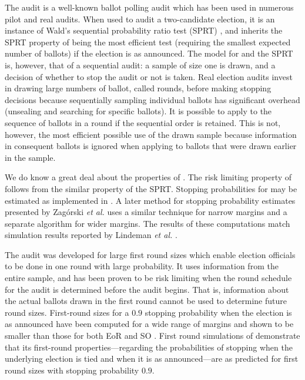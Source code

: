 The \BRAVO audit \cite{bravo} is a well-known ballot polling audit which has been used in numerous pilot and real audits. When used to audit a two-candidate election, it is an instance of Wald's sequential probability ratio test (SPRT) \cite{wald}, and inherits the SPRT property of being the most efficient test (requiring the smallest expected number of ballots) if the election is as announced. The model for \BRAVO and the SPRT is, however, that of a sequential audit: a sample of size one is drawn, and a decision of whether to stop the audit or not is taken. Real election audits invest in drawing large numbers of ballot, called rounds, before making stopping decisions because sequentially sampling individual ballots has significant overhead (unsealing and searching for specific ballots). It is possible to apply \BRAVO to the sequence of ballots in a round if the sequential order is retained. This is not, however, the most efficient possible use of the drawn sample because information in consequent ballots is ignored when applying \BRAVO to ballots that were drawn earlier in the sample. 

We do know a great deal about the properties of \BRAVO. The risk limiting property of \BRAVO follows from the similar property of the SPRT. Stopping probabilities for \BRAVO may be estimated as implemented in \cite{arlo}. A later method for stopping probability estimates presented by Zag{\'o}rski {\em et al.}\cite{usenix_minerva,arxiv_athena} uses a similar technique for narrow margins and a separate algorithm for wider margins. The results of these computations match simulation results reported by Lindeman {\em et al.} \cite[Table 1]{bravo}.  

The \Minerva audit \cite{usenix_minerva,arxiv_athena} was developed for large first round sizes which enable election officials to be done in one round with large probability. It uses information from the entire sample, and has been proven to be risk limiting when the round schedule for the audit is determined before the audit begins. That is, information about the actual ballots drawn in the first round cannot be used to determine future round sizes. First-round sizes for a $0.9$ stopping probability when the election is as announced have been computed for a wide range of margins and shown to be smaller than those for both EoR and SO \BRAVO. First round simulations of \Minerva \cite{arxiv_athena} demonstrate that its first-round properties---regarding the probabilities of stopping when the underlying election is tied and when it is as announced---are as predicted for first round sizes with stopping probability $0.9$. 

